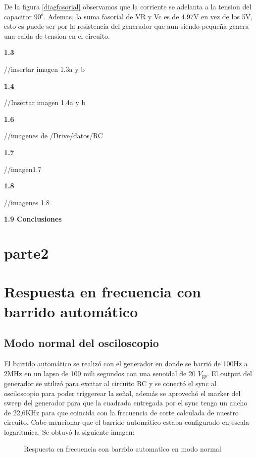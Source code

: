 De la figura \ref{diagfasorial} observamos que la corriente se adelanta a la tension
del capacitor $90^{o}$. Ademas, la suma fasorial de VR y Vc es de
4.97V en vez de los 5V, esto es puede ser por la resistencia del generador
que aun siendo pequeña genera una caida de tension en el circuito.

\textbf{1.3}

//insertar imagen 1.3a y b

\textbf{1.4}

//Insertar imagen 1.4a y b

\textbf{1.6}

//imagenes de /Drive/datos/RC

\textbf{1.7}

//imagen1.7

\textbf{1.8}

//imagenes 1.8

\textbf{1.9 Conclusiones}

\section{parte2}

\section{Respuesta en frecuencia con barrido automático}

\subsection{Modo normal del osciloscopio}

El barrido automático se realizó con el generador en donde se barrió
de 100Hz a 2MHz en un lapso de 100 mili segundos con una senoidal
de 20 $V_{pp}$. El output del generador se utilizó para excitar al
circuito RC y se conectó el sync al osciloscopio para poder triggerear
la señal, además se aprovechó el marker del sweep del generador para
que la cuadrada entregada por el sync tenga un ancho de 22,6KHz para
que coincida con la frecuencia de corte calculada de nuestro circuito.
Cabe mencionar que el barrido automático estaba configurado en escala
logaritmica. Se obtuvó la siguiente imagen:

\begin{figure}[H]
\begin{center}
\par\end{center}
\caption{Respuesta en frecuencia con barrido automatico en modo normal}
\end{figure}

